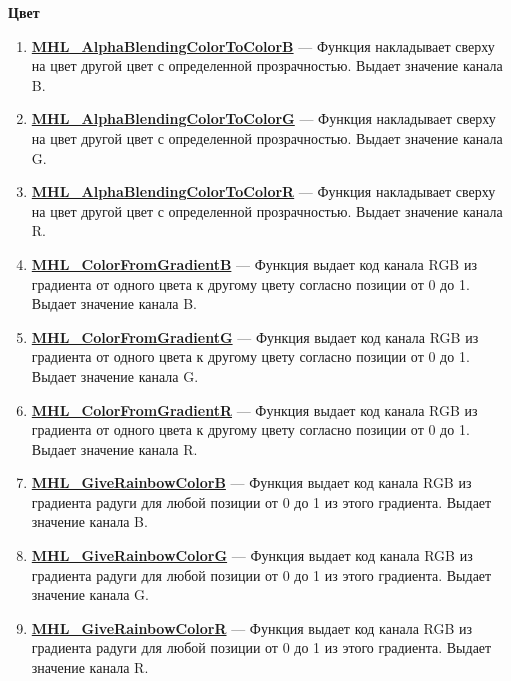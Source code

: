 \documentclass[a4paper,12pt]{article}
\begin{document}
\textbf{Цвет}
\begin{enumerate}

\item \textbf{\hyperref[MHL_AlphaBlendingColorToColorB]{MHL\_AlphaBlendingColorToColorB}} --- Функция накладывает сверху на цвет другой цвет с определенной прозрачностью. Выдает значение канала B.

\item \textbf{\hyperref[MHL_AlphaBlendingColorToColorG]{MHL\_AlphaBlendingColorToColorG}} --- Функция накладывает сверху на цвет другой цвет с определенной прозрачностью. Выдает значение канала G.

\item \textbf{\hyperref[MHL_AlphaBlendingColorToColorR]{MHL\_AlphaBlendingColorToColorR}} --- Функция накладывает сверху на цвет другой цвет с определенной прозрачностью. Выдает значение канала R.

\item \textbf{\hyperref[MHL_ColorFromGradientB]{MHL\_ColorFromGradientB}} --- Функция выдает код канала RGB из градиента от одного цвета к другому цвету согласно позиции от 0 до 1. Выдает значение канала B.

\item \textbf{\hyperref[MHL_ColorFromGradientG]{MHL\_ColorFromGradientG}} --- Функция выдает код канала RGB из градиента от одного цвета к другому цвету согласно позиции от 0 до 1. Выдает значение канала G.

\item \textbf{\hyperref[MHL_ColorFromGradientR]{MHL\_ColorFromGradientR}} --- Функция выдает код канала RGB из градиента от одного цвета к другому цвету согласно позиции от 0 до 1. Выдает значение канала R.

\item \textbf{\hyperref[MHL_GiveRainbowColorB]{MHL\_GiveRainbowColorB}} --- Функция выдает код канала RGB из градиента радуги для любой позиции от 0 до 1 из этого градиента. Выдает значение канала B.

\item \textbf{\hyperref[MHL_GiveRainbowColorG]{MHL\_GiveRainbowColorG}} --- Функция выдает код канала RGB из градиента радуги для любой позиции от 0 до 1 из этого градиента. Выдает значение канала G.

\item \textbf{\hyperref[MHL_GiveRainbowColorR]{MHL\_GiveRainbowColorR}} --- Функция выдает код канала RGB из градиента радуги для любой позиции от 0 до 1 из этого градиента. Выдает значение канала R.

\end{enumerate}
\end{document}

